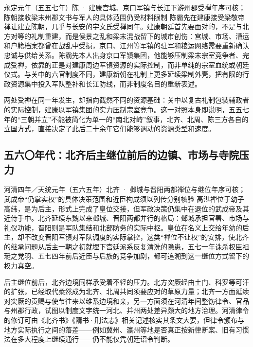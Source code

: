 \begin{event}{}{永定元年（五五七年）}{陈 · 建康宫城、京口军镇与长江下游州郡}{受禅年序可核；陈朝接收梁末州郡文书与军人的具体范围仍受材料限制}
陈霸先在建康接受梁敬帝禅让建立陈朝，几乎与长安的宇文氏受禅同年。建康朝廷首先要面对的，不是与北方对等的礼制重建，而是侯景之乱和梁末混战留下的城市创伤：宫城、市场、漕运和户籍档案都曾在战乱中受损，京口、江州等军镇的驻军和粮运网络需要重新确认忠诚与供给关系。陈霸先本人出身京口军镇集团，他能够压制梁末宗室竞争者、完成受禅，依靠的正是对建康周边军镇资源的实际控制，而非单纯的宗室血统或朝廷仪式。与关中的六官制度不同，建康新朝在礼制上更多延续梁制外壳，把有限的行政资源集中投入军队整补和长江防线，而非制度名目的重新表述。
\end{event}

两处受禅在同一年发生，却指向截然不同的资源基础：关中以复古礼制包装辅政者的实际控制，建康以军镇集团的实力压制宗室竞争。这一对照本身即说明，五五七年的“三朝并立”不能被简化为单一的“南北对峙”叙事，北齐、北周、陈三方各自的立国方式，直接决定了此后二十余年它们能够调动的资源类型和速度。

\subsection{五六〇年代：北齐后主继位前后的边镇、市场与寺院压力}

\begin{event}{}{河清四年／天统元年（五六五年）}{北齐 · 邺城与晋阳两都}{禅位与继位年序可核；武成帝“仍掌实权”的具体决策范围和近臣构成须以列传分别核验}
高湛禅位于幼子高纬，是为后主，形式上完成了皇位交接，但军政决策仍集中在退位的武成帝及其近侍手中。北齐延续东魏以来邺城、晋阳两都并行的格局：邺城承担官署、市场与礼仪功能，晋阳则是军队集结和北部防务的实际中枢。皇位在名义上交给年幼的后主，却不改变晋阳军镇对军队调度的实际掌控，这类“禅位不让权”的安排，使北齐的继承问题从后主一朝之初就埋下宫廷派系反复清洗的隐患，五七一年诛杀权臣祖珽之党羽、五七四年前后近臣与后族的竞争加剧，都可追溯到这一继位方式留下的权力真空。
\end{event}

后主继位前后，北齐边境同样承受着不轻的压力。北方突厥经由土门、科罗等可汗的扩张，已经取代柔然成为北齐、北周共同须要应对的草原力量；北齐一方面延续对突厥的贡赐与使节往来以维系边境和亲，另一方面须在河清年间整饬律令、官品与州郡行政，试图以制度文字统一河北、并州两处差异颇大的地方治理。河清律令的修订可由《北齐书》《隋书·刑法志》相关记述核实其条文大要，但律令颁布与地方实际执行之间的落差——例如冀州、瀛州等地是否真正按新律断案、旧有习惯法在多大程度上继续通行——仍不能仅凭朝廷诏令判断。

